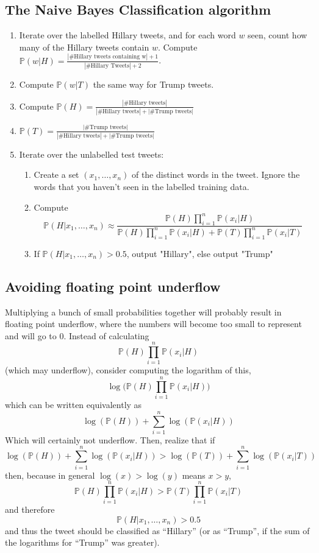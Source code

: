 \documentclass[12pt]{article} \usepackage{amsmath,amssymb,amsthm}
\begin{document}
\subsection{The Naive Bayes Classification algorithm}
\begin{enumerate}
  \item Iterate over the labelled Hillary tweets, and for each word $w$ seen,
  count how many of the Hillary tweets contain $w$. Compute
  $\mathbb{P}(w | H) = \frac{|\text{\# Hillary tweets containing w}| +
    1}{|\text{\# Hillary Tweets}| + 2}$.
\item Compute $\mathbb{P}(w | T)$ the same way for Trump tweets.
\item Compute $\mathbb{P}(H) = \frac{|\text{\# Hillary tweets}|}{|\text{\#
    Hillary tweets}| + |\text{\# Trump tweets}|}$
\item $\mathbb{P}(T) = \frac{|\text{\# Trump tweets}|}{|\text{\# Hillary
    tweets}| + |\text{\# Trump tweets}|}$
\item Iterate over the unlabelled test tweets:
\begin{enumerate}
  \item Create a set $(x_1, \dots, x_n)$ of the distinct words in the tweet.
  Ignore the words that you haven't seen in the labelled training data.
\item Compute
$$\mathbb{P}(H|x_1, \dots, x_n) \approx \frac{\mathbb{P}(H)\prod\limits_{i=1}^n \mathbb{P}(x_i | H)}{\mathbb{P}(H)\prod\limits_{i=1}^n \mathbb{P}(x_i | H) + \mathbb{P}(T)\prod\limits_{i=1}^n \mathbb{P}(x_i | T)}$$
\item If $\mathbb{P}(H|x_1, \dots, x_n) > 0.5$, output "Hillary", else output
"Trump"
\end{enumerate}
\end{enumerate}
\subsection{Avoiding floating point underflow}
Multiplying a bunch of small probabilities together will probably result in
floating point underflow, where the numbers will become too small to represent
and will go to $0$. Instead of calculating
$$\mathbb{P}(H)\prod\limits_{i=1}^n \mathbb{P}(x_i | H)$$
(which may underflow), consider computing the logarithm of this,
$$\log\Big({\mathbb{P}(H)\prod\limits_{i=1}^n \mathbb{P}(x_i | H)}\Big)$$
which can be written equivalently as
$$\log(\mathbb{P}(H))+\sum\limits_{i=1}^n \log(\mathbb{P}(x_i | H))$$
Which will certainly not underflow. Then, realize that if
$$\log(\mathbb{P}(H))+\sum\limits_{i=1}^n \log(\mathbb{P}(x_i | H)) > \log(\mathbb{P}(T))+\sum\limits_{i=1}^n \log(\mathbb{P}(x_i | T))$$
then, because in general $\log(x) > \log(y)$ means $x > y$,
$$\mathbb{P}(H)\prod\limits_{i=1}^n \mathbb{P}(x_i | H) > \mathbb{P}(T)\prod\limits_{i=1}^n \mathbb{P}(x_i | T)$$
and therefore
$$\mathbb{P}(H|x_1, \dots, x_n) > 0.5$$
and thus the tweet should be classified as ``Hillary'' (or as ``Trump'', if the
sum of the logarithms for ``Trump'' was greater).
\end{document}
